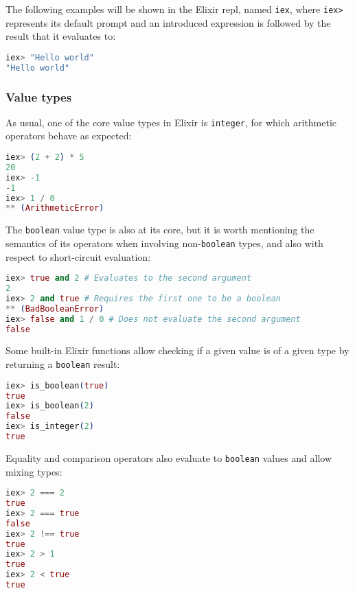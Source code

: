 The following examples will be shown in the Elixir \gls{repl}, named \verb|iex|,
where \verb|iex>| represents its default prompt and an introduced expression is
followed by the result that it evaluates to:

\begin{lstlisting}[language=elixir,numbers=none,frame=none]
iex> "Hello world"
"Hello world"
\end{lstlisting}

\subsubsection{Value types}

As usual, one of the core value types in Elixir is \verb|integer|, for which
arithmetic operators behave as expected:

\begin{lstlisting}[language=elixir,numbers=none,frame=none]
iex> (2 + 2) * 5
20
iex> -1
-1
iex> 1 / 0
** (ArithmeticError)
\end{lstlisting}

The \verb|boolean| value type is also at its core, but it is worth mentioning
the semantics of its operators when involving non-\verb|boolean| types, and also
with respect to short-circuit evaluation:

\begin{lstlisting}[language=elixir,numbers=none,frame=none]
iex> true and 2 # Evaluates to the second argument
2
iex> 2 and true # Requires the first one to be a boolean
** (BadBooleanError)
iex> false and 1 / 0 # Does not evaluate the second argument
false
\end{lstlisting}

Some built-in Elixir functions allow checking if a given value is of a given
type by returning a \verb|boolean| result:

\begin{lstlisting}[language=elixir,numbers=none,frame=none]
iex> is_boolean(true)
true
iex> is_boolean(2)
false
iex> is_integer(2)
true
\end{lstlisting}

Equality and comparison operators also evaluate to \verb|boolean| values and
allow mixing types:

\begin{lstlisting}[language=elixir,numbers=none,frame=none]
iex> 2 === 2
true
iex> 2 === true
false
iex> 2 !== true
true
iex> 2 > 1
true
iex> 2 < true
true
\end{lstlisting}

